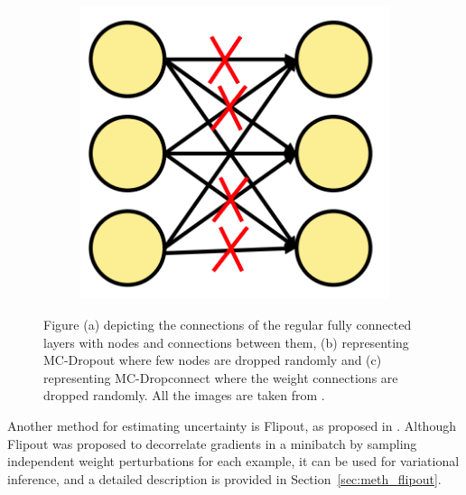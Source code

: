 \begin{figure}[htbp]
\begin{subfigure}{0.33\textwidth}
            \caption{}
            \label{fig:SOTA_Dropout}
        \end{subfigure}
        \begin{subfigure}{0.33\textwidth}
            \centering
            \includegraphics[scale=0.33]{images/DConnect_SOTA.png}
            \caption{}
            \label{fig:SOTA_Dconnect}
        \end{subfigure}
        \caption{Figure (a) depicting the connections of the regular fully connected layers with nodes and connections between them,
        (b) representing MC-Dropout where few nodes are dropped randomly and 
        (c) representing MC-Dropconnect where the weight connections are dropped randomly. All the images are taken from \cite{UQ_Survey}.}
        \label{fig:Dropout_Connect}
    \end{figure}
    Another method for estimating uncertainty is Flipout, as proposed in \cite{Flipout}.
    Although Flipout was proposed to decorrelate gradients in a minibatch by sampling independent weight perturbations for each example, it can be used for variational inference, and a detailed description is provided in Section~\ref{sec:meth_flipout}.
    
    
